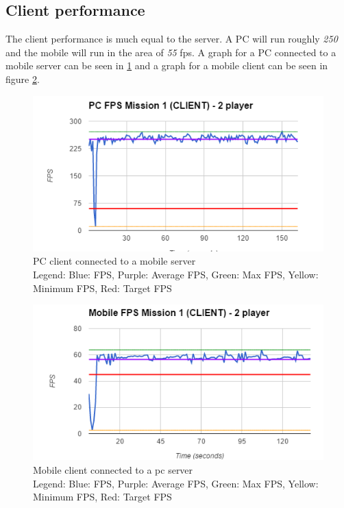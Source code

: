 \subsection*{Client performance}
The client performance is much equal to the server. A PC will run roughly \emph{250} and the mobile will run in the area of \emph{55} fps. A graph for a PC connected to a mobile server can be seen in \ref{test:performance:pcclientmobileserver} and a graph for a mobile client can be seen in figure \ref{test:performance:mobileclientpcserver}.

\begin{figure}[H]
    \includegraphics[width=\textwidth]{figures/test/PCClient2Player}
    \caption{PC client connected to a mobile server \\ Legend: Blue: FPS, Purple: Average FPS, Green: Max FPS, Yellow: Minimum FPS, Red: Target FPS}
    \label{test:performance:pcclientmobileserver}
\end{figure}

\begin{figure}[H]
    \includegraphics[width=\textwidth]{figures/test/MobileClient2Player}
    \caption{Mobile client connected to a pc server \\ Legend: Blue: FPS, Purple: Average FPS, Green: Max FPS, Yellow: Minimum FPS, Red: Target FPS}
    \label{test:performance:mobileclientpcserver}
\end{figure}


